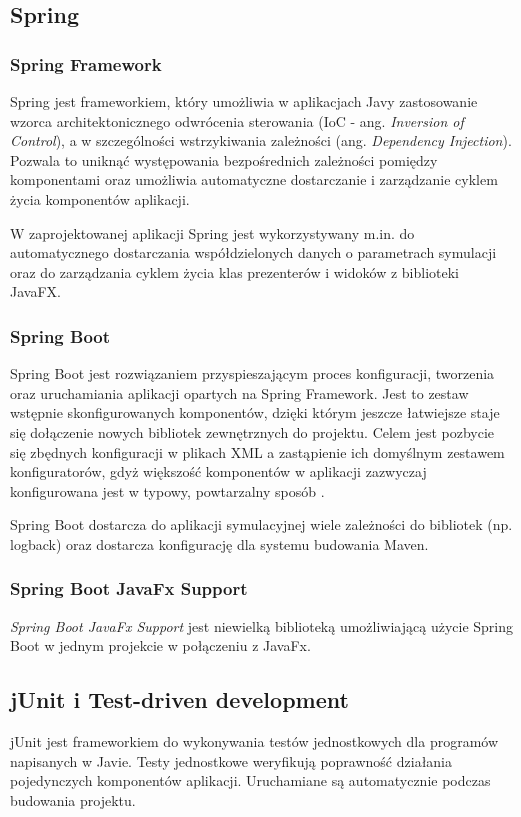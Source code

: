 \subsection{Spring}
\subsubsection{Spring Framework}
Spring jest frameworkiem, który umożliwia w aplikacjach Javy zastosowanie wzorca architektonicznego odwrócenia sterowania (IoC - ang. {\it Inversion of Control}), a w szczególności wstrzykiwania zależności (ang. {\it Dependency Injection}). Pozwala to uniknąć występowania bezpośrednich zależności pomiędzy komponentami oraz umożliwia automatyczne dostarczanie i zarządzanie cyklem życia komponentów aplikacji.

W zaprojektowanej aplikacji Spring jest wykorzystywany m.in. do automatycznego dostarczania współdzielonych danych o parametrach symulacji oraz do zarządzania cyklem życia klas prezenterów i widoków z biblioteki JavaFX.

\subsubsection{Spring Boot}
Spring Boot jest rozwiązaniem przyspieszającym proces konfiguracji, tworzenia oraz uruchamiania aplikacji opartych na Spring Framework.
Jest to zestaw wstępnie skonfigurowanych komponentów, dzięki którym jeszcze łatwiejsze staje się dołączenie nowych bibliotek zewnętrznych do projektu. Celem jest pozbycie się zbędnych konfiguracji w plikach XML a zastąpienie ich domyślnym zestawem konfiguratorów, gdyż większość komponentów w aplikacji zazwyczaj konfigurowana jest w typowy, powtarzalny sposób \cite{docs-springboot}.

Spring Boot dostarcza do aplikacji symulacyjnej wiele zależności do bibliotek (np. logback) oraz dostarcza konfigurację dla systemu budowania Maven.
\subsubsection{Spring Boot JavaFx Support}
{\it Spring Boot JavaFx Support} jest niewielką biblioteką umożliwiającą użycie Spring Boot w jednym projekcie w połączeniu z JavaFx.

\subsection{jUnit i Test-driven development}
\label{ch:junit-tdd}
jUnit jest frameworkiem do wykonywania testów jednostkowych dla programów napisanych w Javie. Testy jednostkowe weryfikują poprawność działania pojedynczych komponentów aplikacji. Uruchamiane są automatycznie podczas budowania projektu.

